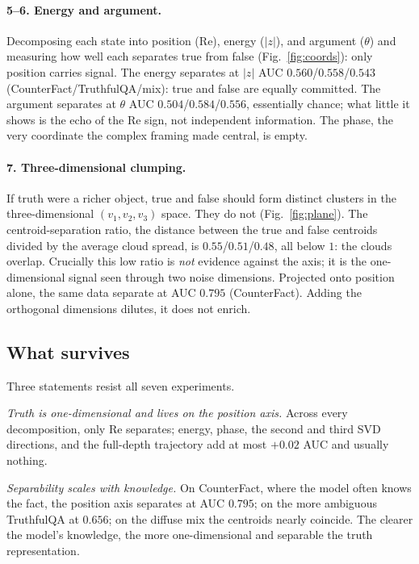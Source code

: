 \documentclass[11pt]{article}
\begin{document}
\paragraph{5--6. Energy and argument.} Decomposing each state into position
($\mathrm{Re}$), energy ($|z|$), and argument ($\theta$) and measuring how
well each separates true from false (Fig.~\ref{fig:coords}): only position
carries signal. The energy separates at $|z|$ AUC $0.560$/$0.558$/$0.543$
(CounterFact/TruthfulQA/mix): true and false are equally committed. The
argument separates at $\theta$ AUC $0.504$/$0.584$/$0.556$, essentially
chance; what little it shows is the echo of the $\mathrm{Re}$ sign, not
independent information. The phase, the very coordinate the complex framing
made central, is empty.

\paragraph{7. Three-dimensional clumping.} If truth were a richer object,
true and false should form distinct clusters in the three-dimensional
$(v_1, v_2, v_3)$ space. They do not (Fig.~\ref{fig:plane}). The
centroid-separation ratio, the distance between the true and false centroids
divided by the average cloud spread, is $0.55$/$0.51$/$0.48$, all below $1$:
the clouds overlap. Crucially this low ratio is \emph{not} evidence against
the axis; it is the one-dimensional signal seen through two noise dimensions.
Projected onto position alone, the same data separate at AUC $0.795$
(CounterFact). Adding the orthogonal dimensions dilutes, it does not enrich.

\subsection{What survives}
\label{sec:survive}

Three statements resist all seven experiments.

\emph{Truth is one-dimensional and lives on the position axis.} Across every
decomposition, only $\mathrm{Re}$ separates; energy, phase, the second and
third SVD directions, and the full-depth trajectory add at most $+0.02$ AUC
and usually nothing.

\emph{Separability scales with knowledge.} On CounterFact, where the model
often knows the fact, the position axis separates at AUC $0.795$; on the more
ambiguous TruthfulQA at $0.656$; on the diffuse mix the centroids nearly
coincide. The clearer the model's knowledge, the more one-dimensional and
separable the truth representation.
\end{document}
